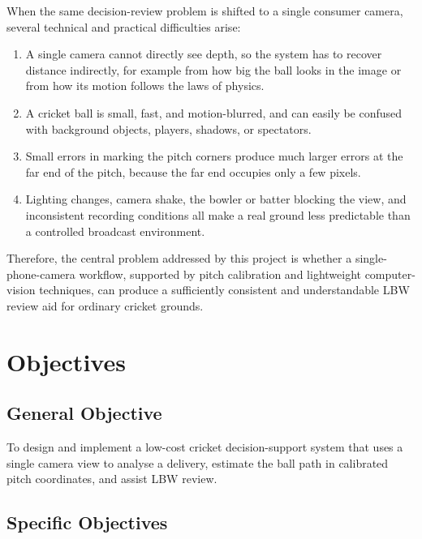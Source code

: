 \documentclass[12pt,a4paper]{report}
\begin{document}
When the same decision-review problem is shifted to a single consumer camera, several technical and practical difficulties arise:

\begin{enumerate}
    \item A single camera cannot directly see depth, so the system has to recover distance indirectly, for example from how big the ball looks in the image or from how its motion follows the laws of physics.
    \item A cricket ball is small, fast, and motion-blurred, and can easily be confused with background objects, players, shadows, or spectators.
    \item Small errors in marking the pitch corners produce much larger errors at the far end of the pitch, because the far end occupies only a few pixels.
    \item Lighting changes, camera shake, the bowler or batter blocking the view, and inconsistent recording conditions all make a real ground less predictable than a controlled broadcast environment.
\end{enumerate}

Therefore, the central problem addressed by this project is whether a single-phone-camera workflow, supported by pitch calibration and lightweight computer-vision techniques, can produce a sufficiently consistent and understandable LBW review aid for ordinary cricket grounds.

\section{Objectives}

\subsection{General Objective}

To design and implement a low-cost cricket decision-support system that uses a single camera view to analyse a delivery, estimate the ball path in calibrated pitch coordinates, and assist LBW review.

\subsection{Specific Objectives}
\end{document}
